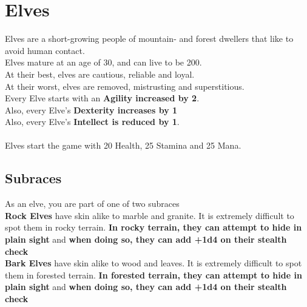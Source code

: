 \section{Elves}
Elves are a short-growing people of mountain- and forest dwellers that like to avoid human contact.\\
Elves mature at an age of 30, and can live to be 200.\\
At their best, elves are cautious, reliable and loyal.\\
At their worst, elves are removed, mistrusting and superstitious.\\
Every Elve starts with an \textbf{Agility increased by 2}.\\
Also, every Elve's \textbf{Dexterity increases by 1}\\
Also, every Elve's \textbf{Intellect is reduced by 1}.\\\\
Elves start the game with 20 Health, 25 Stamina and 25 Mana.\\


\subsection{Subraces}
As an elve, you are part of one of two subraces\\

\textbf{Rock Elves} have skin alike to marble and granite. It is extremely difficult to spot them in rocky terrain. \textbf{In rocky terrain, they can attempt to hide in plain sight} and \textbf{when doing so, they can add +1d4 on their stealth check}\\

\textbf{Bark Elves} have skin alike to wood and leaves. It is extremely difficult to spot them in forested terrain. \textbf{In forested terrain, they can attempt to hide in plain sight} and \textbf{when doing so, they can add +1d4 on their stealth check}\\